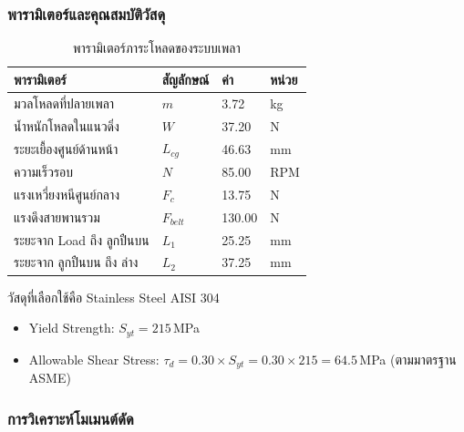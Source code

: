 
\subsubsection{พารามิเตอร์และคุณสมบัติวัสดุ}

\begin{table}[H]
  \centering
  \caption{พารามิเตอร์ภาระโหลดของระบบเพลา}
  \label{tab:shaft_loads}
  \begin{tabular}{llll}
    \toprule
    พารามิเตอร์ & สัญลักษณ์ & ค่า & หน่วย \\
    \midrule
    มวลโหลดที่ปลายเพลา        & $m$        & 3.72   & kg \\
    น้ำหนักโหลดในแนวดิ่ง       & $W$        & 37.20  & N \\
    ระยะเยื้องศูนย์ด้านหน้า     & $L_{cg}$   & 46.63  & mm \\
    ความเร็วรอบ                 & $N$        & 85.00  & RPM \\
    แรงเหวี่ยงหนีศูนย์กลาง     & $F_c$      & 13.75  & N \\
    แรงดึงสายพานรวม            & $F_{belt}$ & 130.00 & N \\
    \midrule
    ระยะจาก Load ถึง ลูกปืนบน  & $L_1$      & 25.25  & mm \\
    ระยะจาก ลูกปืนบน ถึง ล่าง & $L_2$      & 37.25  & mm \\
    \bottomrule
  \end{tabular}
\end{table}

วัสดุที่เลือกใช้คือ Stainless Steel AISI 304
\begin{itemize}
  \item Yield Strength: $S_{yt} = 215$\,MPa
  \item Allowable Shear Stress:
        $\tau_d = 0.30 \times S_{yt}
               = 0.30 \times 215
               = 64.5$\,MPa
        (ตามมาตรฐาน ASME)
\end{itemize}

\subsubsection{การวิเคราะห์โมเมนต์ดัด}

